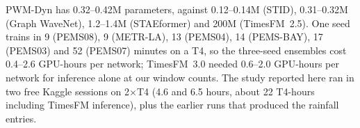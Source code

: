 PWM-Dyn has 0.32--0.42M parameters, against 0.12--0.14M (STID), 0.31--0.32M (Graph WaveNet), 1.2--1.4M (STAEformer)
and 200M (TimesFM~2.5). One seed trains in 9 (PEMS08), 9 (METR-LA), 13 (PEMS04), 14 (PEMS-BAY), 17 (PEMS03) and 52
(PEMS07) minutes on a T4, so the three-seed ensembles cost 0.4--2.6 GPU-hours per network; TimesFM~3.0 needed
0.6--2.0 GPU-hours per network for inference alone at our window counts. The study reported here ran in two free Kaggle sessions on 2$\times$T4 (4.6 and 6.5 hours, about
22 T4-hours including TimesFM inference), plus the earlier runs that produced the rainfall entries.
